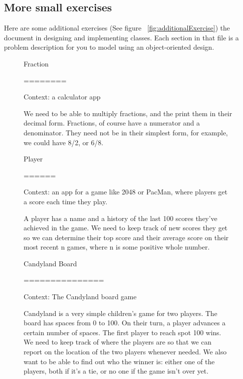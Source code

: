 \documentclass[12pt]{article}
\begin{document}
\subsection*{More small exercises}
Here are some additional exercises (See figure ~\ref{fig:additionalExercise}) the
document in designing and implementing classes. Each section in that file is a
problem description for you to model using an object-oriented design.

\bigskip


\begin{figure}
    \begin{mdframed}
        Fraction

        ========

        \bigskip

        Context: a calculator app

        \bigskip

        We need to be able to multiply fractions, and the print them in their decimal
        form. Fractions, of course have a numerator and a denominator. They need not be
        in their simplest form, for example, we could have 8/2, or 6/8.

        \bigskip

        Player

        ======

        \bigskip

        Context: an app for a game like 2048 or PacMan, where players get a score each
        time they play.

        \bigskip

        A player has a name and a history of the last 100 scores they've achieved in the
        game. We need to keep track of new scores they get so we can determine their top
        score and their average score on their most recent n games, where n is some
        positive whole number.

        \bigskip

        Candyland Board

        ===============

        \bigskip

        Context: The Candyland board game

        \bigskip

        Candyland is a very simple children's game for two players. The board has spaces
        from 0 to 100. On their turn, a player advances a certain number of spaces. The
        first player to reach spot 100 wins. We need to keep track of where the players
        are so that we can report on the location of the two players whenever needed.
        We also want to be able to find out who the winner is: either one of the
        players, both if it's a tie, or no one if the game isn't over yet.


\end{mdframed}
\end{figure}
\end{document}
